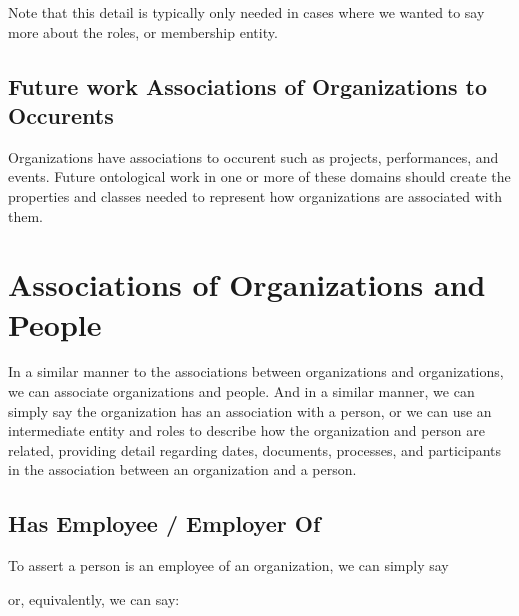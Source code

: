 \documentclass[letterpaper,10pt,english]{sphinxmanual}
\begin{document}
\sphinxAtStartPar
Note that this detail is typically only needed in cases where we wanted to say more
about the roles, or membership entity.


\subsection{Future work \textendash{} Associations of Organizations to Occurents}
\label{\detokenize{associations:future-work-associations-of-organizations-to-occurents}}
\sphinxAtStartPar
Organizations have associations to occurent such as projects, performances, and
events.  Future ontological work in one or more of these domains should
create the properties and classes needed to represent how organizations
are associated with them.


\section{Associations of Organizations and People}
\label{\detokenize{associations:associations-of-organizations-and-people}}
\sphinxAtStartPar
In a similar manner to the associations between organizations and organizations, we can
associate organizations and people.  And in a similar manner, we can simply
say the organization has an association with a person, or we can use an intermediate
entity and roles to describe how the organization and person are related, providing
detail regarding dates, documents, processes, and participants in the association
between an organization and a person.


\subsection{Has Employee / Employer Of}
\label{\detokenize{associations:has-employee-employer-of}}
\sphinxAtStartPar
To assert a person is an employee of an organization, we can simply say

\begin{sphinxVerbatim}[commandchars=\\\{\}]
  
\end{sphinxVerbatim}

\sphinxAtStartPar
or, equivalently, we can say:

\begin{sphinxVerbatim}[commandchars=\\\{\}]
  
\end{sphinxVerbatim}
\end{document}
